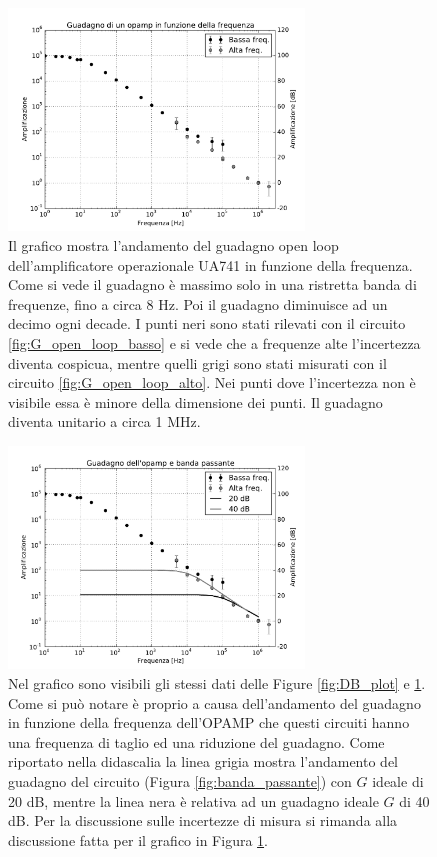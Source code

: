 \begin{figure}
    \includegraphics[width=0.7\textwidth]{Figure/A_vs_freq.pdf}
    \caption{Il grafico mostra l'andamento del guadagno open loop dell'amplificatore operazionale UA741 in funzione della frequenza. Come si vede il guadagno è massimo solo in una ristretta banda di frequenze, fino a circa 8 Hz. Poi il guadagno diminuisce ad un decimo ogni decade. I punti neri sono stati rilevati con il circuito \ref{fig:G_open_loop_basso} e si vede che a frequenze alte l'incertezza diventa cospicua, mentre quelli grigi sono stati misurati con il circuito \ref{fig:G_open_loop_alto}. Nei punti dove l'incertezza non è visibile essa è minore della dimensione dei punti. Il guadagno diventa unitario a circa 1 MHz.}
    \label{fig:G_openloop_plot1}
\end{figure}

\begin{figure}
    \includegraphics[width=0.7\textwidth]{Figure/gabp.pdf}
    \caption{Nel grafico sono visibili gli stessi dati delle Figure \ref{fig:DB_plot} e \ref{fig:G_openloop_plot1}. Come si può notare è proprio a causa dell'andamento del guadagno in funzione della frequenza dell'OPAMP che questi circuiti hanno una frequenza di taglio ed una riduzione del guadagno. Come riportato nella didascalia la linea grigia mostra l'andamento del guadagno del circuito (Figura \ref{fig:banda_passante}) con $G$ ideale di 20 dB, mentre la linea nera è relativa ad un guadagno ideale $G$ di 40 dB. Per la discussione sulle incertezze di misura si rimanda alla discussione fatta per il grafico in Figura \ref{fig:G_openloop_plot1}.}
    \label{fig:G_openloop_plot2}
\end{figure}
